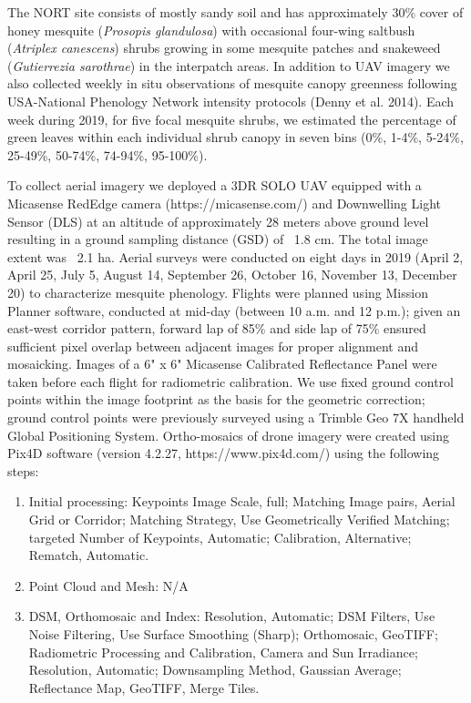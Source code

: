 \documentclass{article}
\begin{document}
The NORT site consists of mostly sandy soil and has approximately 30\% cover of honey mesquite (\textit{Prosopis glandulosa}) with occasional four-wing saltbush (\textit{Atriplex canescens}) shrubs growing in some mesquite patches and snakeweed (\textit{Gutierrezia sarothrae}) in the interpatch areas. In addition to UAV imagery we also collected weekly in situ observations of mesquite canopy greenness following USA-National Phenology Network intensity protocols (Denny et al. 2014). Each week during 2019, for five focal mesquite shrubs, we estimated the percentage of green leaves within each individual shrub canopy in seven bins (0\%, 1-4\%, 5-24\%, 25-49\%, 50-74\%, 74-94\%, 95-100\%).

To collect aerial imagery we deployed a 3DR SOLO UAV equipped with a Micasense RedEdge camera (https://micasense.com/) and Downwelling Light Sensor (DLS) at an altitude of approximately 28 meters above ground level resulting in a ground sampling distance (GSD) of ~1.8 cm. The total image extent was ~2.1 ha.
Aerial surveys were conducted on eight days in 2019 (April 2, April 25, July 5, August 14, September 26, October 16, November 13, December 20) to characterize mesquite phenology. Flights were planned using Mission Planner software, conducted at mid-day (between 10 a.m. and 12 p.m.); given an east-west corridor pattern, forward lap of 85\% and side lap of 75\% ensured sufficient pixel overlap between adjacent images for proper alignment and mosaicking.
Images of a 6" x 6" Micasense Calibrated Reflectance Panel were taken before each flight for radiometric calibration. We use fixed ground control points within the image footprint as the basis for the geometric correction; ground control points were previously surveyed using a Trimble Geo 7X handheld Global Positioning System. 
Ortho-mosaics of drone imagery were created using Pix4D software (version 4.2.27, https://www.pix4d.com/) using the following steps:
\begin{enumerate}
    \item Initial processing: Keypoints Image Scale, full; Matching Image pairs, Aerial Grid or Corridor; Matching Strategy, Use Geometrically Verified Matching; targeted Number of Keypoints, Automatic; Calibration, Alternative; Rematch, Automatic.
    \item Point Cloud and Mesh: N/A
    \item DSM, Orthomosaic and Index: Resolution, Automatic; DSM Filters, Use Noise Filtering, Use Surface Smoothing (Sharp); Orthomosaic, GeoTIFF; Radiometric Processing and Calibration, Camera and Sun Irradiance; Resolution, Automatic; Downsampling Method, Gaussian Average; Reflectance Map, GeoTIFF, Merge Tiles.
\end{enumerate}
\end{document}
